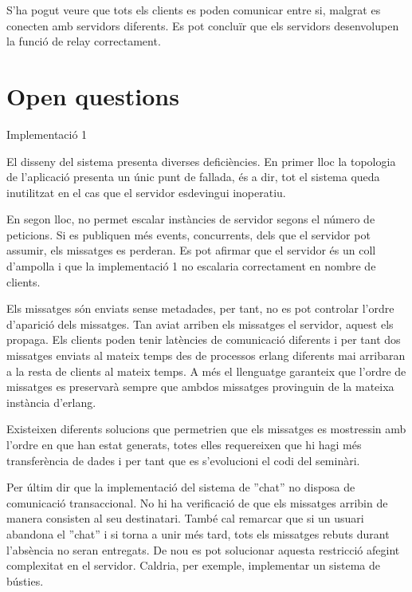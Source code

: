 \documentclass[a4paper, 11pt]{article}
\begin{document}
S'ha pogut veure que tots els clients es poden comunicar entre si, malgrat es conecten amb servidors diferents.
Es pot concluïr que els servidors desenvolupen la funció de relay correctament. 

\section{Open questions}


Implementació 1

El disseny del sistema presenta diverses deficiències. En primer lloc la topologia de l'aplicació presenta un únic punt de fallada, és a dir, tot el sistema queda inutilitzat en el cas que el servidor esdevingui inoperatiu. 

En segon lloc, no permet escalar instàncies de servidor segons el número de peticions. Si es publiquen més events, concurrents, dels que el servidor pot assumir, els missatges es perderan.
Es pot afirmar que el servidor és un coll d'ampolla i que la implementació 1 no escalaria correctament en nombre de clients. 

Els missatges són enviats sense metadades, per tant, no es pot controlar l'ordre d'aparició dels missatges. Tan aviat arriben els missatges el servidor, aquest els propaga. Els clients poden tenir latències de comunicació diferents i per tant dos missatges enviats al mateix temps des de processos erlang diferents mai arribaran a la resta de clients al mateix temps. A més el llenguatge garanteix que l'ordre de missatges es preservar\`a sempre que ambdos missatges provinguin de la mateixa inst\`ancia d'erlang.

Existeixen diferents solucions que permetrien que els missatges es mostressin amb l'ordre en que han estat generats, totes elles requereixen que hi hagi més transferència de dades i per tant que es s'evolucioni el codi del seminàri. 

Per últim dir que la implementació del sistema de ''chat'' no disposa de comunicació transaccional. No hi ha verificació de que els missatges arribin de manera consisten al seu destinatari. També cal remarcar que si un usuari abandona el ''chat'' i si torna a unir més tard, tots els missatges rebuts durant l'absència no seran entregats. 
De nou es pot solucionar aquesta restricció afegint complexitat en el servidor. Caldria, per exemple, implementar un sistema de bústies. 
\end{document}
